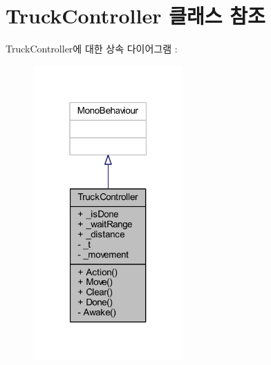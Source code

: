 \hypertarget{class_truck_controller}{}\section{Truck\+Controller 클래스 참조}
\label{class_truck_controller}


Truck\+Controller에 대한 상속 다이어그램 \+: \nopagebreak
\begin{figure}[H]
\begin{center}
\leavevmode
\includegraphics[width=163pt]{d7/df2/class_truck_controller__inherit__graph}
\end{center}
\end{figure}


